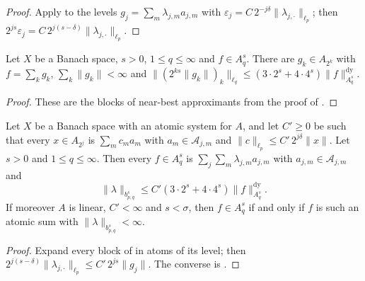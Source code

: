 \begin{proof}
\leanok
Apply  to the levels $g_j = \sum_m \lambda_{j,m} a_{j,m}$ with
$\varepsilon_j = C \, 2^{-j\delta} \|\lambda_{j,\cdot}\|_{\ell_p}$; then
$2^{js} \varepsilon_j = C \, 2^{j(s - \delta)} \|\lambda_{j,\cdot}\|_{\ell_p}$.
\end{proof}

\begin{lemma}
\label{lem:exists-blocks}
\leanok
{}
Let $X$ be a Banach space, $s > 0$, $1 \leq q \leq \infty$ and $f \in A^s_q$. There are
$g_k \in A_{2^k}$ with $f = \sum_k g_k$, $\sum_k \|g_k\| < \infty$ and
$\|(2^{ks} \|g_k\|)_k\|_{\ell_q} \leq (3 \cdot 2^s + 4 \cdot 4^s) \|f\|^{\mathrm{dy}}_{A^s_q}$.
\end{lemma}

\begin{proof}
\leanok
These are the blocks of near-best approximants from the proof of
.
\end{proof}

\begin{theorem}
\label{thm:atomic-analysis}
\leanok
{}
Let $X$ be a Banach space with an atomic system for $A$, and let $C' \geq 0$ be such that every
$x \in A_{2^j}$ is $\sum_m c_m a_m$ with $a_m \in \mathcal{A}_{j,m}$ and
$\|c\|_{\ell_p} \leq C' \, 2^{j\delta} \|x\|$. Let $s > 0$ and $1 \leq q \leq \infty$. Then
every $f \in A^s_q$ is $\sum_j \sum_m \lambda_{j,m} a_{j,m}$ with $a_{j,m} \in
\mathcal{A}_{j,m}$ and
\[
  \|\lambda\|_{b^s_{p,q}} \leq C' (3 \cdot 2^s + 4 \cdot 4^s) \|f\|^{\mathrm{dy}}_{A^s_q} .
\]
If moreover $A$ is linear, $C' < \infty$ and $s < \sigma$, then $f \in A^s_q$ if and only if
$f$ is such an atomic sum with $\|\lambda\|_{b^s_{p,q}} < \infty$.
\end{theorem}

\begin{proof}
\leanok
Expand every block of  in atoms of its level; then
$2^{j(s-\delta)} \|\lambda_{j,\cdot}\|_{\ell_p} \leq C' \, 2^{js} \|g_j\|$. The converse is
.
\end{proof}

